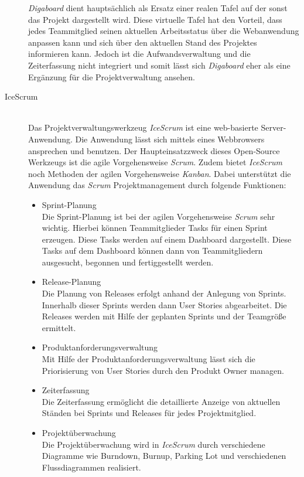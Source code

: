 \begin{description}
\emph{Digaboard} dient hauptsächlich als Ersatz einer realen Tafel auf der sonst das Projekt dargestellt wird. Diese virtuelle Tafel hat den Vorteil, dass jedes Teammitglied seinen aktuellen Arbeitsstatus über die Webanwendung anpassen kann und sich über den aktuellen Stand des Projektes informieren kann. Jedoch ist die Aufwandsverwaltung und die Zeiterfassung nicht integriert und somit lässt sich \emph{Digaboard} eher als eine Ergänzung für die Projektverwaltung ansehen. \cite {bib:digaboard} \\

\item[IceScrum]\hspace*{1em}\\
Das Projektverwaltungswerkzeug \emph{IceScrum} ist eine web-basierte Server\--Anwendung. Die Anwendung lässt sich mittels eines Webbrowsers ansprechen und benutzen. Der Haupteinsatzzweck dieses Open-Source Werkzeugs ist die agile Vorgehensweise \emph{Scrum}. Zudem bietet \emph{IceScrum} noch Methoden der agilen Vorgehensweise \emph{Kanban}.
Dabei unterstützt die Anwendung das \emph{Scrum} Projektmanagement durch folgende Funktionen:
\begin{itemize}
\item Sprint-Planung\\
Die Sprint-Planung ist bei der agilen Vorgehensweise \emph{Scrum} sehr wichtig. Hierbei können Teammitglieder Tasks für einen Sprint erzeugen. Diese Tasks werden auf einem Dashboard dargestellt. Diese Tasks auf dem Dashboard können dann von Teammitgliedern ausgesucht, begonnen und fertiggestellt werden.

\item Release-Planung\\
Die Planung von Releases erfolgt anhand der Anlegung von Sprints. Innerhalb dieser Sprints werden dann User Stories abgearbeitet. Die Releases werden mit Hilfe der geplanten Sprints und der Teamgröße ermittelt.

\item Produktanforderungsverwaltung\\
Mit Hilfe der Produktanforderungsverwaltung lässt sich die Priorisierung von User Stories durch den Produkt Owner managen.

\item Zeiterfassung\\
Die Zeiterfassung ermöglicht die detaillierte Anzeige von aktuellen Ständen bei Sprints und Releases für jedes Projektmitglied.

\item Projektüberwachung\\
Die Projektüberwachung wird in \emph{IceScrum} durch verschiedene Diagramme wie Burndown, Burnup, Parking Lot und verschiedenen Flussdiagrammen realisiert.


\end{itemize}
\end{description}
